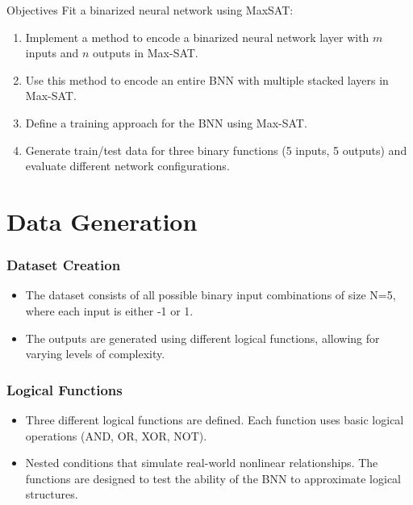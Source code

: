 \documentclass[12pt]{beamer}
\begin{document}
\begin{frame}{Objectives}
Fit a binarized neural network using MaxSAT:
\begin{enumerate}
    \item Implement a method to encode a binarized neural network layer with  \( m \) inputs and \( n \) outputs in Max-SAT.
    \item Use this method to encode an entire BNN with multiple stacked layers in Max-SAT.
    \item Define a training approach for the BNN using Max-SAT.
    \item Generate train/test data for three binary functions (5 inputs, 5 outputs) and evaluate different network configurations.
\end{enumerate}
\end{frame}


\section{Data Generation}

\begin{frame}
\frametitle{Dataset Creation}
\begin{itemize}
    \item The dataset consists of all possible binary input combinations of size N=5, where each input is either -1 or 1.
    \item The outputs are generated using different logical functions, allowing for varying levels of complexity.
\end{itemize}
\end{frame}

\begin{frame}
\frametitle{Logical Functions}
\begin{itemize}
    \item Three different logical functions are defined. Each function uses basic logical operations (AND, OR, XOR, NOT).
    \item Nested conditions that simulate real-world nonlinear relationships. The functions are designed to test the ability of the BNN to approximate logical structures.
\end{itemize}
\end{frame}
\end{document}
